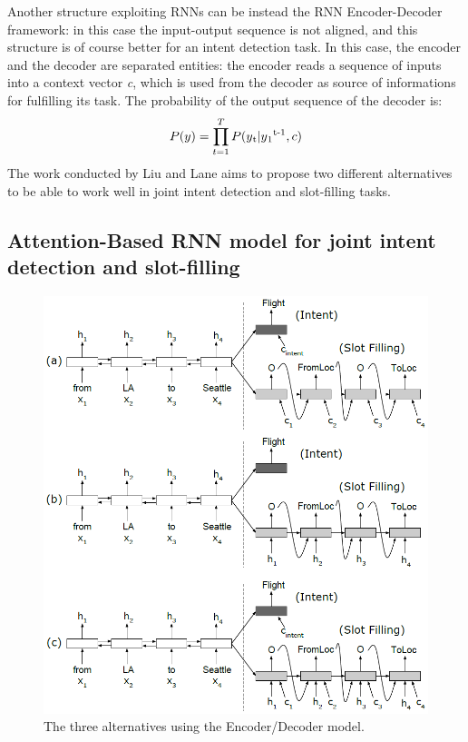 \documentclass[a4paper,12pt]{report}
\begin{document}
	Another structure exploiting RNNs can be instead the RNN Encoder-Decoder framework: in this case the input-output sequence is not aligned, and this structure is of course better for an intent detection task. In this case, the encoder and the decoder are separated entities: the encoder reads a sequence of inputs into a context vector \textit{c}, which is used from the decoder as source of informations for fulfilling its task. The probability of the output sequence of the decoder is:
	\begin{equation}
	P(y) = \prod_{t=1}^{T} P(y\textsubscript{t}|y\textsubscript{1}\textsuperscript{t-1},c)
	\end{equation}
	The work conducted by Liu and Lane aims to propose two different alternatives to be able to work well in joint intent detection and slot-filling tasks.
	\subsection{Attention-Based RNN model for joint intent detection and slot-filling}
	\begin{figure}[H]
		\centering
		\includegraphics[scale=0.4]{alt1}
		\caption{The three alternatives using the Encoder/Decoder model.}
	\end{figure}
\end{document}
